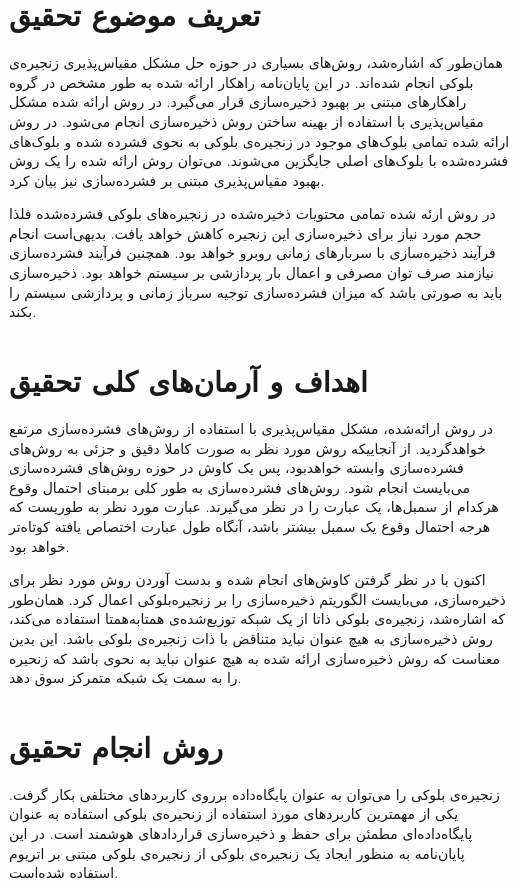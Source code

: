 \section{تعریف موضوع تحقیق}
همان‌طور که اشاره‌شد، روش‌های بسیاری در حوزه حل مشکل‌ مقیاس‌پذیری زنجیره‌ی بلوکی انجام شده‌اند. در این پایان‌نامه راهکار ارائه شده به طور مشخص در گروه راهکارهای مبتنی بر بهبود ذخیره‌سازی قرار می‌گیرد. در روش ارائه شده مشکل مقیاس‌پذیری با استفاده از بهینه‌ ساختن روش ذخیره‌سازی انجام می‌شود. در روش ارائه شده تمامی بلوک‌های موجود در زنجیره‌ی بلوکی به نحوی فشرده شده و بلوک‌های فشرده‌شده با بلوک‌های اصلی جایگزین می‌شوند. می‌توان روش ارائه شده را یک روش بهبود مقیاس‌پذیری مبتنی بر فشرده‌سازی نیز بیان کرد.


در روش ارئه شده تمامی محتویات ذخیره‌شده در زنجیره‌های بلوکی فشرده‌شده فلذا حجم مورد نیاز برای ذخیره‌سازی این زنجیره کاهش خواهد یافت. بدیهی‌است انجام فرآیند ذخیره‌سازی با سربارهای زمانی روبرو خواهد بود. همچنین فرآیند فشرده‌سازی نیازمند صرف توان مصرفی و  اعمال بار پردازشی بر سیستم‌ خواهد بود. ذخیره‌سازی باید به صورتی باشد که میزان فشرده‌سازی توجیه سرباز زمانی و پردازشی سیستم‌ را بکند.

\section{اهداف و آرمان‌های کلی تحقیق}
در روش ارائه‌شده، مشکل مقیاس‌پذیری با استفاده از روش‌های فشرده‌سازی مرتفع خواهدگردید. از آنجاییکه روش مورد نظر به صورت کاملا دقیق و جزئی به روش‌های فشرده‌سازی وابسته‌ خواهد‌بود، پس یک کاوش در حوزه روش‌های فشرده‌سازی می‌بایست انجام شود. روش‌های فشرده‌سازی به طور کلی برمبنای احتمال وقوع هرکدام از سمبل‌ها، یک عبارت را در نظر می‌گیرند. عبارت مورد نظر به طوریست که هرجه احتمال وقوع یک سمبل بیشتر باشد، آنگاه طول عبارت اختصاص یافته کوتاه‌تر خواهد بود. 


اکنون با در نظر گرفتن کاوش‌های انجام شده و بدست آوردن روش مورد نظر برای ذخیره‌سازی، می‌بایست الگوریتم ذخیره‌سازی را بر زنجیره‌بلوکی اعمال کرد. همان‌طور که اشاره‌شد، زنجیره‌ی بلوکی ذاتا از یک شبکه توزیع‌شده‌ی همتا‌به‌همتا استفاده می‌کند، روش ذخیره‌سازی به هیچ عنوان نباید متناقض با ذات زنجیره‌ی بلوکی باشد. این بدین معناست که روش ذخیره‌سازی ارائه شده به هیچ عنوان نباید به نحوی‌ باشد که زنحیره را به سمت یک شبکه متمرکز سوق دهد.

\section{روش انجام تحقیق}
زنجیره‌ی بلوکی را می‌توان به عنوان پایگاه‌داده برروی کاربردهای مختلفی بکار گرفت. یکی از مهمترین کاربردهای مورد استفاده از زنحیره‌ی بلوکی استفاده به عنوان پایگاه‌داده‌‌ای مطمئن برای حفظ و ذخیره‌سازی قراردا‌د‌های هوشمند است. در این پایان‌نامه به منظور ایجاد یک زنجیره‌ی بلوکی از زنجیره‌ی بلوکی مبتنی بر اتریوم استفاده ‌شده‌است.

